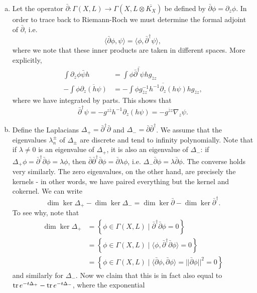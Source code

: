 \documentclass{../mathnotes}
\begin{document}
\begin{enumerate}[(a)]
    \item Let the operator $\bar\partial:\Gamma(X,L)\to\Gamma(X,L\otimes\overline{K_X})$ be defined by $\bar\partial\phi=\partial_{\bar z}\phi$.
        In order to trace back to Riemann-Roch we must determine the formal adjoint of $\bar\partial$, i.e.
        \[\langle \bar\partial\phi,\psi\rangle=\langle\phi,\bar\partial^\dagger\psi\rangle,\]
        where we note that these inner products are taken in different spaces. More explicitly,
        \begin{align*}
            \int\partial_{\bar z}\phi\bar\psi h&=\int \phi\overline{\bar\partial^\dagger\psi}hg_{\bar zz}\\
            -\int\phi\overline{\partial_z(h\psi)}&=-\int \phi\overline{g_{\bar zz}^{-1}h^{-1}\partial_z(h\psi)}hg_{\bar zz},
        \end{align*}
        where we have integrated by parts. This shows that
        \[\bar\partial^\dagger\psi=-g^{z\bar z}h^{-1}\partial_z(h\psi)=-g^{\bar zz}\nabla_z\psi.\]
    \item Define the Laplacians $\Delta_+=\bar\partial^\dagger\bar\partial$ and $\Delta_-=\bar\partial\bar\partial^\dagger$. We assume that the eigenvalues
        $\lambda_n^{\pm}$ of $\Delta_{\pm}$ are discrete and tend to infinity polynomially. Note that if $\lambda\neq 0$ is an eigenvalue of $\Delta_+$,
        it is also an eigenvalue of $\Delta_-$: if $\Delta_+\phi=\bar\partial^\dagger\bar\partial\phi=\lambda\phi$, then
        $\bar\partial\bar\partial^\dagger\bar\partial\phi=\bar\partial\lambda\phi$, i.e. $\Delta_-\bar\partial\phi=\lambda\bar\partial\phi$. The converse
        holds very similarly. The zero eigenvalues, on the other hand, are precisely the kernels - in other words, we have paired everything
        but the kernel and cokernel. We can write
        \[\dim\ker\Delta_+-\dim\ker\Delta_-=\dim\ker\bar\partial-\dim\ker\bar\partial^\dagger.\]
        To see why, note that
        \begin{align*}
            \dim\ker\Delta_+&=\left\{ \phi\in\Gamma(X,L)\mid \bar\partial^\dagger\bar\partial\phi=0 \right\}\\
            &=\left\{ \phi\in\Gamma(X,L)\mid \langle\phi,\bar\partial^\dagger\bar\partial\phi\rangle=0 \right\}\\
            &=\left\{ \phi\in\Gamma(X,L)\mid \langle\bar\partial\phi,\bar\partial\phi\rangle=||\bar\partial\phi||^2=0 \right\}
        \end{align*}
        and similarly for $\Delta_-$. Now we claim that this is in fact also equal to $\operatorname{tr} e^{-t\Delta_+}-\operatorname{tr} e^{-t\Delta_-}$, where the exponential

\end{enumerate}
\end{document}
